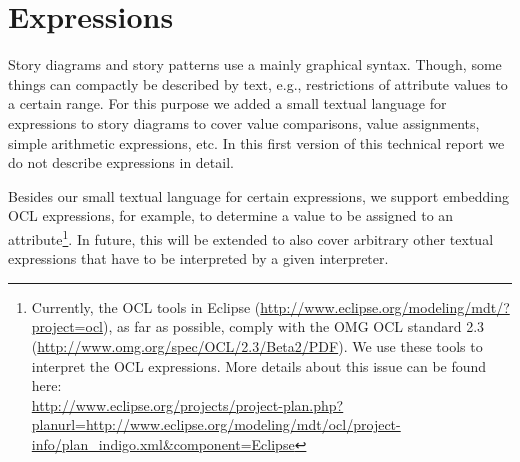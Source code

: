 \section{Expressions} \label{sec:Expressions}

Story diagrams and story patterns use a mainly graphical syntax.
Though, some things can compactly be described by text, e.g., restrictions of attribute values to a certain range.
For this purpose we added a small textual language for expressions to story diagrams
to cover value comparisons, value assignments, simple arithmetic expressions, etc.
In this first version of this technical report we do not describe expressions in detail.

Besides our small textual language for certain expressions, we support embedding OCL expressions, for example, to determine a value to be assigned to an attribute\footnote{Currently,
the OCL tools in Eclipse (\href{http://www.eclipse.org/modeling/mdt/?project=ocl}{http://www.eclipse.org/modeling/mdt/?project=ocl}),
as far as possible, comply with the OMG OCL standard 2.3 (\href{http://www.omg.org/spec/OCL/2.3/Beta2/PDF}{http://www.omg.org/spec/OCL/2.3/Beta2/PDF}).
We use these tools to interpret the OCL expressions.
More details about this issue can be found here:\\ \href{http://www.eclipse.org/projects/project-plan.php?planurl=http://www.eclipse.org/modeling/mdt/ocl/project-info/plan_indigo.xml&component=Eclipse}{http://www.eclipse.org/projects/project-plan.php?planurl=http://www.eclipse.org/modeling/mdt/ocl/project-info/plan\_indigo.xml\&component=Eclipse}}.
In future, this will be extended to also cover arbitrary other textual expressions that have to be interpreted by a given interpreter.